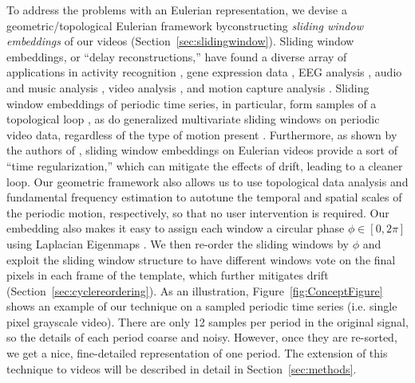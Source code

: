 \documentclass{article}
\begin{document}
To address the problems with an Eulerian representation, we devise a geometric/topological Eulerian framework byconstructing {\em sliding window embeddings} of our videos (Section~\ref{sec:slidingwindow}).  Sliding window embeddings, or ``delay reconstructions,'' have found a diverse array of applications in activity recognition \cite{frank2010activity,venkataraman2016shape}, gene expression data \cite{perea2015sw1pers}, EEG analysis \cite{stam2005nonlinear, plesnik2014detection}, audio and music analysis \cite{herzel1994analysis,serra2009cross,bello2011measuring,traliemoebius}, video analysis \cite{tralie2017quasi}, and motion capture analysis \cite{venkataraman2016shape}.  Sliding window embeddings of periodic time series, in particular, form samples of a topological loop \cite{perea2015sliding}, as do generalized multivariate sliding windows on periodic video data, regardless of the type of motion present \cite{traliehigh, tralie2017quasi}.  Furthermore, as shown by the authors of \cite{tralie2017quasi}, sliding window embeddings on Eulerian videos provide a sort of ``time regularization,'' which can mitigate the effects of drift, leading to a cleaner loop.  Our geometric framework also allows us to use topological data analysis \cite{edelsbrunner2000topological,edelsbrunner2008persistent,edelsbrunner2010computational,carlsson2009topology,ghrist2014elementary} and fundamental frequency estimation \cite{Mcleod05asmarter} to autotune the temporal and spatial scales of the periodic motion, respectively, so that no user intervention is required.  Our embedding also makes it easy to assign each window a circular phase $\phi \in [0, 2\pi]$ using Laplacian Eigenmaps \cite{belkin2003laplacian}.  We then re-order the sliding windows by $\phi$ and exploit the sliding window structure to have different windows vote on the final pixels in each frame of the template, which further mitigates drift (Section~\ref{sec:cyclereordering}).  As an illustration, Figure~\ref{fig:ConceptFigure} shows an example of our technique on a sampled periodic time series (i.e. single pixel grayscale video).  There are only 12 samples per period in the original signal, so the details of each period coarse and noisy.  However, once they are re-sorted, we get a nice, fine-detailed representation of one period.  The extension of this technique to videos will be described in detail in Section~\ref{sec:methods}.
\end{document}
